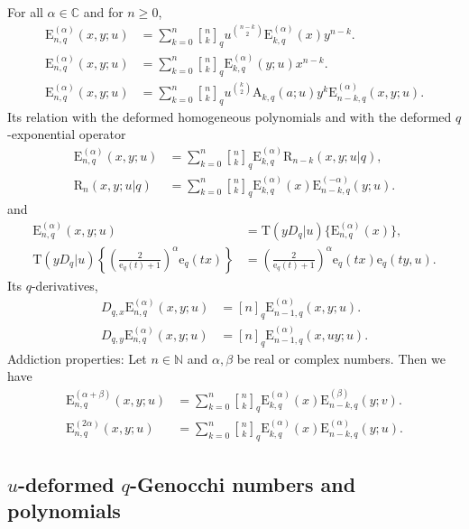 \documentclass[12pt]{article}
\newcommand{\qbinom}{\genfrac{[}{]}{0pt}{}}
\newcommand{\C}{\mathbb{C}}
\newcommand{\N}{\mathbb{N}}
\newcommand{\e}{\mathrm{e}}
\newcommand{\AAA}{\mathrm{A}}
\newcommand{\E}{\mathrm{E}}
\newcommand{\rr}{\mathrm{R}}
\newcommand{\T}{\mathrm{T}}
\begin{document}
For all $\alpha\in\C$ and for $n\geq0$,
    \begin{align}
        \E_{n,q}^{(\alpha)}(x,y;u)&=\sum_{k=0}^{n}\qbinom{n}{k}_{q}u^{\binom{n-k}{2}}\E_{k,q}^{(\alpha)}(x)y^{n-k}.\\
        \E_{n,q}^{(\alpha)}(x,y;u)&=\sum_{k=0}^{n}\qbinom{n}{k}_{q}\E_{k,q}^{(\alpha)}(y;u)x^{n-k}.\\
        \E_{n,q}^{(\alpha)}(x,y;u)&=\sum_{k=0}^{n}\qbinom{n}{k}_{q}u^{\binom{k}{2}}\AAA_{k,q}(a;u)y^{k}\E_{n-k,q}^{(\alpha)}(x,y;u).
    \end{align}
Its relation with the deformed homogeneous polynomials and with the deformed $q$-exponential operator
\begin{align}
        \E_{n,q}^{(\alpha)}(x,y;u)&=\sum_{k=0}^{n}\qbinom{n}{k}_{q}\E_{k,q}^{(\alpha)}\rr_{n-k}(x,y;u|q),\\
        \rr_{n}(x,y;u|q)&=\sum_{k=0}^{n}\qbinom{n}{k}_{q}\E_{k,q}^{(\alpha)}(x)\E_{n-k,q}^{(-\alpha)}(y;u).
    \end{align}
and
\begin{align}
        \E_{n,q}^{(\alpha)}(x,y;u)&=\T(yD_{q}|u)\{\E_{n,q}^{(\alpha)}(x)\},\\
        \T(yD_{q}|u)\left\{\left(\frac{2}{\e_{q}(t)+1}\right)^{\alpha}\e_{q}(tx)\right\}&=\left(\frac{2}{\e_{q}(t)+1}\right)^{\alpha}\e_{q}(tx)\e_{q}(ty,u).
    \end{align}
Its $q$-derivatives,
\begin{align}
        D_{q,x}\E_{n,q}^{(\alpha)}(x,y;u)&=[n]_{q}\E_{n-1,q}^{(\alpha)}(x,y;u).\\
        D_{q,y}\E_{n,q}^{(\alpha)}(x,y;u)&=[n]_{q}\E_{n-1,q}^{(\alpha)}(x,uy;u).
    \end{align}
Addiction properties:
Let $n\in\N$ and $\alpha,\beta$ be real or complex numbers. Then we have
    \begin{align}
        \E_{n,q}^{(\alpha+\beta)}(x,y;u)&=\sum_{k=0}^{n}\qbinom{n}{k}_{q}\E_{k,q}^{(\alpha)}(x)\E_{n-k,q}^{(\beta)}(y;v).\\
        \E_{n,q}^{(2\alpha)}(x,y;u)&=\sum_{k=0}^{n}\qbinom{n}{k}_{q}\E_{k,q}^{(\alpha)}(x)\E_{n-k,q}^{(\alpha)}(y;u).
    \end{align}


\subsection{$u$-deformed $q$-Genocchi numbers and polynomials}
\end{document}
